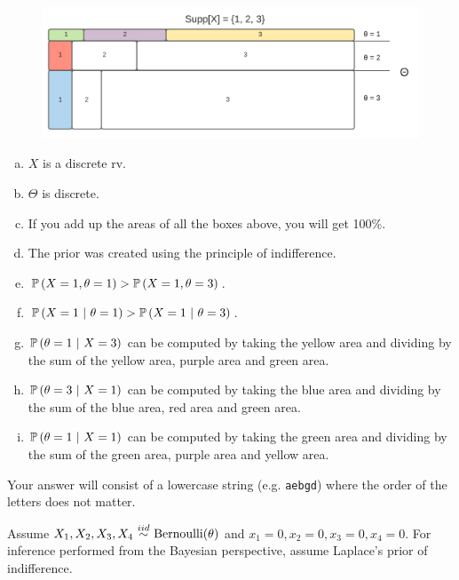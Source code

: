 \documentclass[12pt,landscape]{article}
\newcommand{\instr}{\small Your answer will consist of a lowercase string (e.g. \texttt{aebgd}) where the order of the letters does not matter. \normalsize}
\begin{document}
\begin{figure}[htp]
\centering
\includegraphics[width = 6.5in]{x_theta_space.pdf}
\end{figure}

\vspace{-0.2cm}\benum{} 

\begin{enumerate}[(a)]
\item $X$ is a discrete rv.
\item $\Theta$ is discrete.
\item If you add up the areas of all the boxes above, you will get 100\%.
\item The prior was created using the principle of indifference.
\item $\mathbb{P}\left(X = 1, \theta = 1\right) > \mathbb{P}\left(X = 1, \theta = 3\right)$.
\item $\mathbb{P}\left(X = 1~|~\theta = 1\right) > \mathbb{P}\left(X = 1~|~\theta = 3\right)$.
\item $\mathbb{P}\left(\theta = 1~|~X = 3\right)$ can be computed by taking the yellow area and dividing by the sum of the yellow area, purple area and green area.
\item $\mathbb{P}\left(\theta = 3~|~X = 1\right)$ can be computed by taking the blue area and dividing by the sum of the blue area, red area and green area.
\item $\mathbb{P}\left(\theta = 1~|~X = 1\right)$ can be computed by taking the green area and dividing by the sum of the green area, purple area and yellow area.
\end{enumerate}
\eenum\instr\pagebreak


\problem{} Assume $X_1, X_2, X_3, X_4 \iid \text{Bernoulli}(\theta)$ and $x_1 = 0, x_2 = 0, x_3 = 0, x_4 = 0$. For inference performed from the Bayesian perspective, assume Laplace's prior of indifference.

\vspace{-0.2cm}\benum{} 
\end{document}
